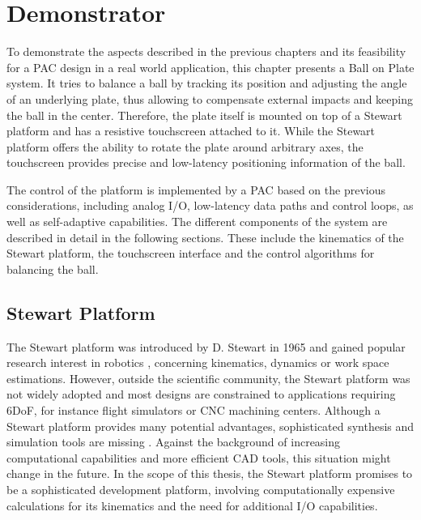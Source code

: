 \chapter{Demonstrator}
\label{chap:demonstrator}

To demonstrate the aspects described in the previous chapters and its
feasibility for a \ac{PAC} design in a real world application, this chapter
presents a Ball on Plate system. It tries to balance a ball by tracking its
position and adjusting the angle of an underlying plate, thus allowing to
compensate external impacts and keeping the ball in the center. Therefore, the
plate itself is mounted on top of a Stewart platform and has a resistive
touchscreen attached to it. While the Stewart platform offers the ability to
rotate the plate around arbitrary axes, the touchscreen provides precise and
low-latency positioning information of the ball.

The control of the platform is implemented by a \ac{PAC} based on the previous
considerations, including analog I/O, low-latency data paths and control
loops, as well as self-adaptive capabilities. The different components of the
system are described in detail in the following sections. These include the
kinematics of the Stewart platform, the touchscreen interface and the control
algorithms for balancing the ball.

\section{Stewart Platform}
The Stewart platform was introduced by D. Stewart in 1965 \citep{Ste65} and
gained popular research interest in robotics \citep{Szu13}, concerning
kinematics, dynamics or work space estimations. However, outside the
scientific community, the Stewart platform was not widely adopted and most
designs are constrained to applications requiring \ac{6DoF}, for instance
flight simulators or \ac{CNC} machining centers. Although a Stewart platform
provides many potential advantages, sophisticated synthesis and simulation
tools are missing \citep{Ji96}. Against the background of increasing
computational capabilities and more efficient \ac{CAD} tools, this situation
might change in the future. In the scope of this thesis, the Stewart platform
promises to be a sophisticated development platform, involving computationally
expensive calculations for its kinematics and the need for additional I/O
capabilities.


